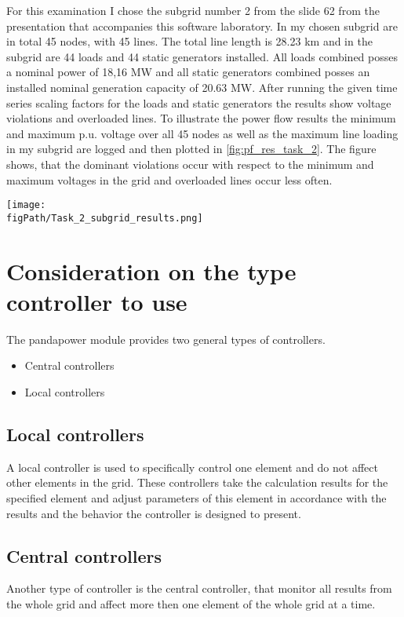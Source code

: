 \documentclass[conference]{IEEEtran}
\newcommand{\figPath}{images}
\begin{document}
For this examination I chose the subgrid number 2 from the slide 62 from the presentation that accompanies this software laboratory.\cite[S.62]{software.lab.pp.2023} In my chosen subgrid are in total 45 nodes, with 45 lines. The total line length is 28.23 km and in the subgrid are 44 loads and 44 static generators installed. All loads combined posses a nominal power of 18,16 MW and all static generators combined posses an installed nominal generation capacity of 20.63 MW. After running the given time series scaling factors for the loads and static generators the results show voltage violations and overloaded lines. To illustrate the power flow results the minimum and maximum p.u. voltage over all 45 nodes as well as the maximum line loading in my subgrid are logged and then plotted in \cref{fig:pf_res_task_2}. The figure shows, that the dominant violations occur with respect to the minimum and maximum voltages in the grid and overloaded lines occur less often.

\begin{figure*}[htbp]
	\centering
	\texttt{[image: \\figPath/Task\_2\_subgrid\_results.png]}
	\caption{Power flow results from the time series calculation}
	\label{fig:pf_res_task_2}
\end{figure*}

\section{Consideration on the type controller to use}

The pandapower module provides two general types of controllers. 
\begin{itemize}
	\item Central controllers
	\item Local controllers
\end{itemize}
\subsection{Local controllers}
A local controller is used to specifically control one element and do not affect other elements in the grid. These controllers take the calculation results for the specified element and adjust parameters of this element in accordance with the results and the behavior the controller is designed to present.
\subsection{Central controllers}
Another type of controller is the central controller, that monitor all results from the whole grid and affect more then one element of the whole grid at a time.
\end{document}
